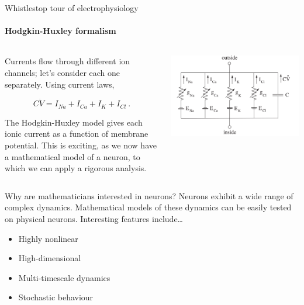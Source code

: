 \documentclass[aspectratio=169]{beamer}
\begin{document}
\begin{frame}[label={sec:org37c3372}]{Whistlestop tour of electrophysiology}
\framesubtitle{Hodgkin-Huxley formalism}

\begin{columns}
\begin{column}{0.5\columnwidth}
Currents flow through different ion channels; let's consider each one separately.
Using current laws,

\begin{equation}
    C\dot{V} = I_{Na} + I_{Ca} + I_{K} + I_{Cl}~.
\end{equation}

The Hodgkin-Huxley model gives each ionic current as a function of membrane potential.
This is exciting, as we now have a mathematical model of a neuron, to which we can apply a rigorous analysis.
\end{column}

\begin{column}{0.5\columnwidth}
\begin{center}
\includegraphics[width=.9\linewidth]{./neuroncircuit.png}
\end{center}
\end{column}
\end{columns}
\end{frame}

\begin{frame}[label={sec:org31c302e}]{Why are mathematicians interested in neurons?}
Neurons exhibit a wide range of complex dynamics.
Mathematical models of these dynamics can be easily tested on physical neurons.
Interesting features include\ldots{}
\begin{itemize}[<+->]
\item Highly nonlinear
\item High-dimensional
\item Multi-timescale dynamics
\item Stochastic behaviour
\end{itemize}
\end{frame}
\end{document}
